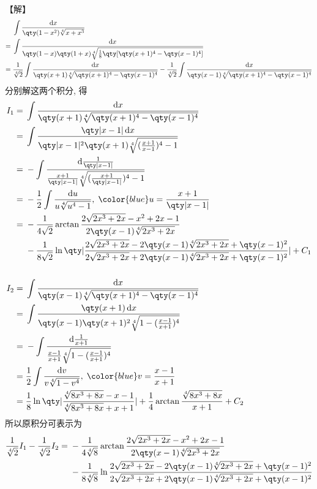 \documentclass{ctexbook}
\newcommand*{\dif}{\mathop{}\!\mathrm{d}}
\begin{document}
{【解】
\begin{align*}
{}&\int\frac{\dif{x}}{\qty(1-x^{2})\sqrt[4]{x+x^{3}}}\\
={}&\int\frac{\dif{x}}{\qty(1-x)\qty(1+x)\sqrt[4]{\frac{1}{8}\qty[\qty(x+1)^{4}-\qty(x-1)^{4}]}}\\
={}&\frac{1}{\sqrt[4]{2}}\int\frac{\dif{x}}{\qty(x+1)\sqrt[4]{\qty(x+1)^{4}-\qty(x-1)^{4}}}-\frac{1}{\sqrt[4]{2}}\int\frac{\dif{x}}{\qty(x-1)\sqrt[4]{\qty(x+1)^{4}-\qty(x-1)^{4}}}
\end{align*}
分别解这两个积分, 得
\begin{align*}
I_{1}={}&\int\frac{\dif{x}}{\qty(x+1)\sqrt[4]{\qty(x+1)^{4}-\qty(x-1)^{4}}}\\
={}&\int\frac{\qty|x-1|\dif{x}}{\qty|x-1|^{2}\qty(x+1)\sqrt[4]{(\frac{x+1}{x-1})^{4}-1}}\\
={}&-\int\frac{\dif{\frac{1}{\qty|x-1|}}}{\frac{x+1}{\qty|x-1|}\sqrt[4]{(\frac{x+1}{\qty|x-1|})^{4}-1}}\\
={}&-\frac{1}{2}\int\frac{\dif{u}}{u\sqrt[4]{u^{4}-1}},\;{\color{blue}u=\frac{x+1}{\qty|x-1|}}\\
={}&-\frac{1}{4\sqrt{2}}\arctan{\frac{2\sqrt{2x^{3}+2x}-x^{2}+2x-1}{2\qty(x-1)\sqrt[4]{2x^{3}+2x}}}\\
{}&-\frac{1}{8\sqrt{2}}\ln\qty|\frac{2\sqrt{2x^{3}+2x}-2\qty(x-1)\sqrt[4]{2x^{3}+2x}+\qty(x-1)^{2}}{2\sqrt{2x^{3}+2x}+2\qty(x-1)\sqrt[4]{2x^{3}+2x}+\qty(x-1)^{2}}|+C_{1}\\
\\
I_{2}={}&\int\frac{\dif{x}}{\qty(x-1)\sqrt[4]{\qty(x+1)^{4}-\qty(x-1)^{4}}}\\
={}&\int\frac{\qty(x+1)\dif{x}}{\qty(x-1)\qty(x+1)^{2}\sqrt[4]{1-(\frac{x-1}{x+1})^{4}}}\\
={}&-\int\frac{\dif{\frac{1}{x+1}}}{\frac{x-1}{x+1}\sqrt[4]{1-(\frac{x-1}{x+1})^{4}}}\\
={}&\frac{1}{2}\int\frac{\dif{v}}{v\sqrt[4]{1-v^{4}}},\;{\color{blue}v=\frac{x-1}{x+1}}\\
={}&\frac{1}{8}\ln\qty|\frac{\sqrt[4]{8x^{3}+8x}-x-1}{\sqrt[4]{8x^{3}+8x}+x+1}|+\frac{1}{4}\arctan{\frac{\sqrt[4]{8x^{3}+8x}}{x+1}}+C_{2}
\end{align*}
所以原积分可表示为
\begin{align*}
\frac{1}{\sqrt[4]{2}}I_{1}-\frac{1}{\sqrt[4]{2}}I_{2}={}&-\frac{1}{4\sqrt[4]{8}}\arctan{\frac{2\sqrt{2x^{3}+2x}-x^{2}+2x-1}{2\qty(x-1)\sqrt[4]{2x^{3}+2x}}}\\
{}&-\frac{1}{8\sqrt[4]{8}}\ln{\frac{2\sqrt{2x^{3}+2x}-2\qty(x-1)\sqrt[4]{2x^{3}+2x}+\qty(x-1)^{2}}{2\sqrt{2x^{3}+2x}+2\qty(x-1)\sqrt[4]{2x^{3}+2x}+\qty(x-1)^{2}}}\\

\end{align*}}
\end{document}
